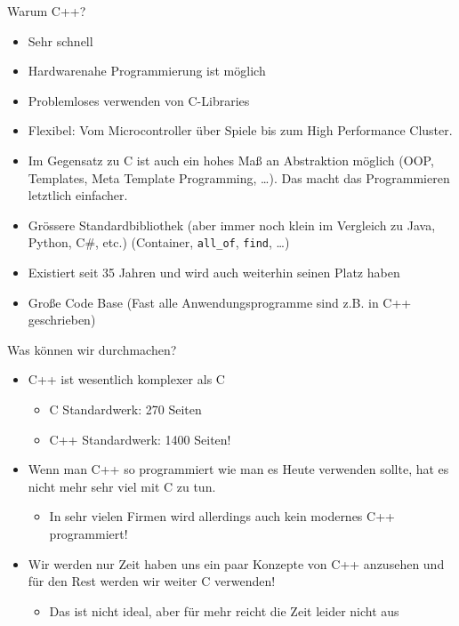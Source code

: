 \documentclass[presentation]{beamer}
\begin{document}
\begin{frame}[fragile,label={sec:org565996e}]{Warum C++?}
 \begin{itemize}
\item Sehr \alert{schnell}
\item \alert{Hardwarenahe Programmierung} ist möglich
\item Problemloses verwenden von \alert{C-Libraries}
\item \alert{Flexibel}: Vom Microcontroller über Spiele bis zum High Performance
Cluster.
\item Im Gegensatz zu C ist auch ein \alert{hohes Maß an Abstraktion} möglich
(OOP, Templates, Meta Template Programming, \ldots{}). Das macht das
Programmieren letztlich \alert{einfacher}.
\item \alert{Grössere Standardbibliothek} (aber immer noch klein im Vergleich zu
Java, Python, C\#, etc.) (Container, {\color{solarizedYellow}\texttt{all\_of}}, {\color{solarizedYellow}\texttt{find}}, \ldots{})
\item Existiert seit \alert{35 Jahren} und wird auch weiterhin seinen Platz haben
\item \alert{Große Code Base} (Fast alle Anwendungsprogramme sind z.B. in C++
geschrieben)
\end{itemize}
\end{frame}
\begin{frame}[label={sec:org99f0a8a}]{Was können wir durchmachen?}
\begin{itemize}
\item C++ ist wesentlich komplexer als C
\begin{itemize}
\item C Standardwerk: 270 Seiten
\item C++ Standardwerk: \alert{1400 Seiten!}
\end{itemize}
\item Wenn man C++ so programmiert wie man es Heute verwenden sollte, hat
es nicht mehr sehr viel mit C zu tun.
\begin{itemize}
\item In sehr vielen Firmen wird allerdings auch kein modernes C++
programmiert!
\end{itemize}
\item Wir werden nur Zeit haben uns ein paar Konzepte von C++ anzusehen
und für den Rest werden wir weiter C verwenden!
\begin{itemize}
\item Das ist nicht ideal, aber für mehr reicht die Zeit leider nicht
aus
\end{itemize}
\end{itemize}
\end{frame}
\end{document}
